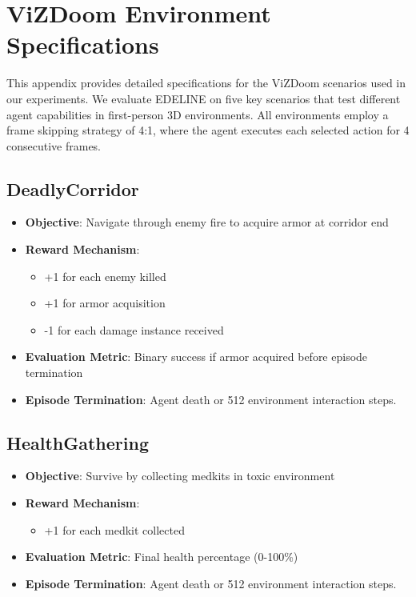 \section{ViZDoom Environment Specifications} 
\label{appendix:vizdoom_envs}
This appendix provides detailed specifications for the ViZDoom scenarios used in our experiments. We evaluate EDELINE on five key scenarios that test different agent capabilities in first-person 3D environments. All environments employ a frame skipping strategy of 4:1, where the agent executes each selected action for 4 consecutive frames.
\small
\subsection{DeadlyCorridor}
\begin{itemize}
\item \textbf{Objective}: Navigate through enemy fire to acquire armor at corridor end
\item \textbf{Reward Mechanism}:
\begin{itemize}
\item +1 for each enemy killed
\item +1 for armor acquisition
\item -1 for each damage instance received
\end{itemize}
\item \textbf{Evaluation Metric}: Binary success if armor acquired before episode termination
\item \textbf{Episode Termination}: Agent death or 512 environment interaction steps.
\end{itemize}

\subsection{HealthGathering}
\begin{itemize}
\item \textbf{Objective}: Survive by collecting medkits in toxic environment
\item \textbf{Reward Mechanism}:
\begin{itemize}
\item +1 for each medkit collected
\end{itemize}
\item \textbf{Evaluation Metric}: Final health percentage (0-100\%)
\item \textbf{Episode Termination}: Agent death or 512 environment interaction steps.
\end{itemize}

